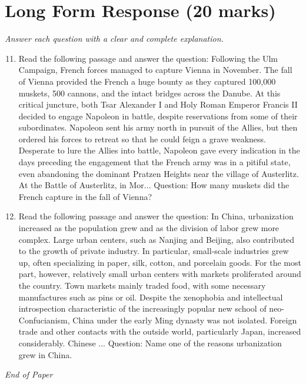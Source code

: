 \documentclass[12pt]{article}
\begin{document}
\section*{Long Form Response (20 marks)}
\textit{Answer each question with a clear and complete explanation.}
\begin{enumerate}[label=\arabic*.]
\setcounter{enumi}{10}
\item Read the following passage and answer the question: Following the Ulm Campaign, French forces managed to capture Vienna in November. The fall of Vienna provided the French a huge bounty as they captured 100,000 muskets, 500 cannons, and the intact bridges across the Danube. At this critical juncture, both Tsar Alexander I and Holy Roman Emperor Francis II decided to engage Napoleon in battle, despite reservations from some of their subordinates. Napoleon sent his army north in pursuit of the Allies, but then ordered his forces to retreat so that he could feign a grave weakness. Desperate to lure the Allies into battle, Napoleon gave every indication in the days preceding the engagement that the French army was in a pitiful state, even abandoning the dominant Pratzen Heights near the village of Austerlitz. At the Battle of Austerlitz, in Mor... Question: How many muskets did the French capture in the fall of Vienna?
\item Read the following passage and answer the question: In China, urbanization increased as the population grew and as the division of labor grew more complex. Large urban centers, such as Nanjing and Beijing, also contributed to the growth of private industry. In particular, small-scale industries grew up, often specializing in paper, silk, cotton, and porcelain goods. For the most part, however, relatively small urban centers with markets proliferated around the country. Town markets mainly traded food, with some necessary manufactures such as pins or oil. Despite the xenophobia and intellectual introspection characteristic of the increasingly popular new school of neo-Confucianism, China under the early Ming dynasty was not isolated. Foreign trade and other contacts with the outside world, particularly Japan, increased considerably. Chinese ... Question: Name one of the reasons urbanization grew in China.
\end{enumerate}

\vfill
\noindent\textit{End of Paper}
\end{document}
